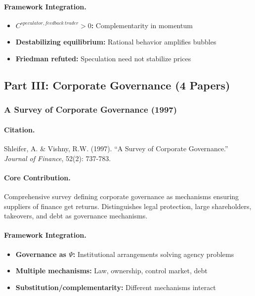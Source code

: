 \paragraph{Framework Integration.}
\begin{itemize}
  \item \textbf{$C^{speculator,feedback\ trader} > 0$:} Complementarity in momentum
  \item \textbf{Destabilizing equilibrium:} Rational behavior amplifies bubbles
  \item \textbf{Friedman refuted:} Speculation need not stabilize prices
\end{itemize}

\subsection{Part III: Corporate Governance (4 Papers)}

\subsubsection{A Survey of Corporate Governance (1997)}

\paragraph{Citation.}
Shleifer, A. \& Vishny, R.W. (1997).
``A Survey of Corporate Governance.'' \emph{Journal of Finance}, 52(2): 737-783.

\paragraph{Core Contribution.}
Comprehensive survey defining corporate governance as mechanisms ensuring
suppliers of finance get returns. Distinguishes legal protection, large
shareholders, takeovers, and debt as governance mechanisms.

\paragraph{Framework Integration.}
\begin{itemize}
  \item \textbf{Governance as $\Psi$:} Institutional arrangements solving agency problems
  \item \textbf{Multiple mechanisms:} Law, ownership, control market, debt
  \item \textbf{Substitution/complementarity:} Different mechanisms interact
\end{itemize}


